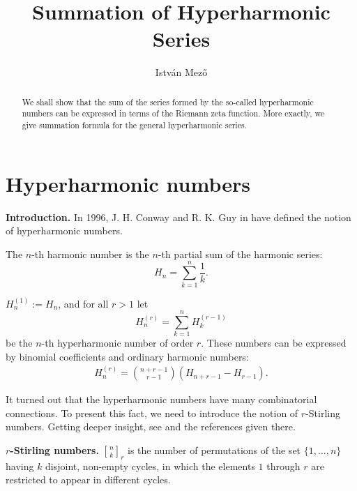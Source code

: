 \documentclass[a4paper,12pt]{amsart}
\begin{document}
\title{Summation of Hyperharmonic Series}
\author{Istv\'an Mez\H{o}}
\address{Institute of Mathematics, University of Debrecen, Hungary}

\newtheorem{Theorem}{Theorem}
\newtheorem{Lemma}[Theorem]{Lemma}
\newtheorem{Corollary}[Theorem]{Corollary}
\theoremstyle{definition}
\newtheorem{Definition}[Theorem]{Definition}
\newtheorem{Example}[Theorem]{Example}

\begin{abstract}
We shall show that the sum of the series formed by the so-called hyperharmonic numbers can be expressed in terms of the Riemann zeta function. More exactly, we give summation formula for the general hyperharmonic series.
\end{abstract}

\maketitle

\section{Hyperharmonic numbers}

\textbf{Introduction.} In 1996, J. H. Conway and R. K. Guy in \cite{CG} have defined the notion of hyperharmonic numbers.

The $n$-th harmonic number is the $n$-th partial sum of the harmonic series:
\[H_n=\sum_{k=1}^n\frac{1}{k}.\]

$H_n^{(1)}:=H_n$, and for all $r>1$ let
\[H_n^{(r)}=\sum_{k=1}^n H_k^{(r-1)}\]
be the $n$-th hyperharmonic number of order $r$.
These numbers can be expressed by binomial coefficients and ordinary harmonic numbers:
\begin{eqnarray}
H_n^{(r)}=\binom{n+r-1}{r-1}(H_{n+r-1}-H_{r-1}).\label{Hnr_binom}
\end{eqnarray}

It turned out that the hyperharmonic numbers have many combinatorial connections. To
present this fact, we need to introduce the notion of $r$-Stirling numbers. Getting deeper insight, see \cite{BGG} and the references given there.

\textbf{$r$-Stirling numbers.} ${\genfrac[]{0pt}{}{{n}}{{k}}}_r$ is the number of permutations of the set $\{1,\dots,n\}$ having $k$ disjoint,
non-empty cycles, in which the elements $1$ through $r$ are restricted to appear in different cycles.
\end{document}
